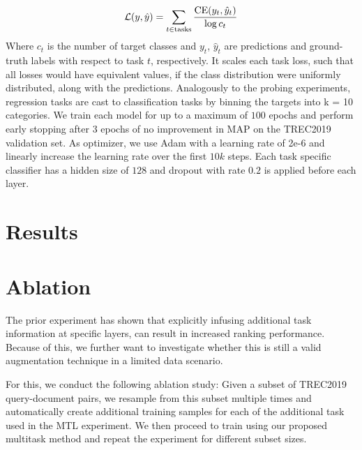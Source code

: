 \begin{equation}
    \mathcal{L}(y, \hat{y}) = \sum_{t \in \text{tasks}} \frac{\textnormal{CE}(y_t, \hat{y}_t)}{\log c_t}
\end{equation}
Where $c_t$ is the number of target classes and $y_t$, $\hat{y}_t$ are predictions and ground-truth labels with respect to task $t$, respectively. It scales each task loss, such that all losses would have equivalent values, if the class distribution were uniformly distributed, along with the predictions. Analogously to the probing experiments, regression tasks are cast to classification tasks by binning the targets into k = 10 categories.
We train each model for up to a maximum of $100$ epochs and perform early stopping after $3$ epochs of no improvement in MAP on the TREC2019 validation set. As optimizer, we use Adam\cite{kingma2014adam} with a learning rate of 2e-6 and linearly increase the learning rate over the first $10k$ steps. Each task specific classifier has a hidden size of $128$ and dropout with rate $0.2$ is applied before each layer.

\section{Results}
\section{Ablation}
The prior experiment has shown that explicitly infusing additional task information at specific layers, can result in increased ranking performance. Because of this, we further want to investigate whether this is still a valid augmentation technique in a limited data scenario.

For this, we conduct the following ablation study: Given a subset of TREC2019 query-document pairs, we resample from this subset multiple times and automatically create additional training samples for each of the additional task used in the MTL experiment. We then proceed to train using our proposed multitask method and repeat the experiment for different subset sizes.